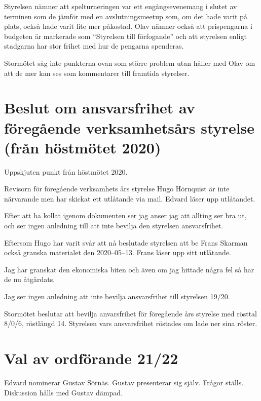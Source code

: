 \documentclass[a4paper]{article}
\begin{document}
Styrelsen nämner att spelturneringen var ett engångsevenemang i slutet av
terminen som de jämför med en avslutningsmeetup som, om det hade varit på plats,
också hade varit lite mer påkostad. Olav nämner också att prispengarna i
budgeten är markerade som ``Styrelsen till förfogande'' och att styrelsen enligt
stadgarna har stor frihet med hur de pengarna spenderas.

Stormötet såg inte punkterna ovan som större problem utan håller med Olav om att de
mer kan ses som kommentarer till framtida styrelser.

\section{Beslut om ansvarsfrihet av föregående verksamhetsårs styrelse (från höstmötet 2020)}

Uppskjuten punkt från höstmötet 2020.

Revisorn för föregående verksamhets års styrelse Hugo Hörnquist är inte
närvarande men har skickat ett utlåtande via mail. Edvard läser upp utlåtandet.

\begin{displayquote}
  Efter att ha kollat igenom dokumenten ser jag anser jag att allting
  ser bra ut, och ser ingen anledning till att inte bevilja den
  styrelsen ansvarsfrihet.
\end{displayquote}

Eftersom Hugo har varit svår att nå beslutade styrelsen att be Frans Skarman
också granska materialet den 2020--05--13. Frans läser upp sitt utlåtande.

\begin{displayquote}
  Jag har granskat den ekonomiska biten och även om jag hittade några fel så har de nu åtgärdats.

  Jag ser ingen anledning att inte bevilja ansvarsfrihet till styrelsen 19/20.
\end{displayquote}

Stormötet beslutar att bevilja anvarsfrihet för föregående års styrelse med
rösttal 8/0/6, röstlängd 14. Styrelsen vars ansvarsfrihet röstades om lade ner
sina röster.

\section{Val av ordförande 21/22}

Edvard nominerar Gustav Sörnäs. Gustav presenterar sig själv. Frågor ställs. Diskussion
hålls med Gustav dämpad.
\end{document}
